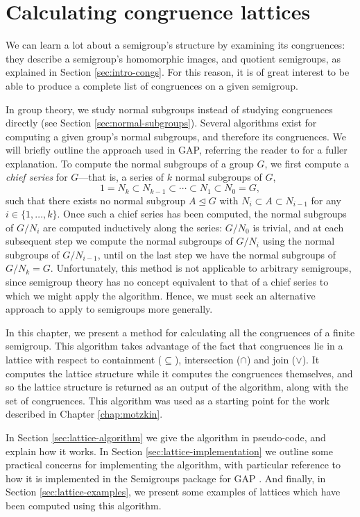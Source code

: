 \chapter{Calculating congruence lattices}
\label{chap:lattice}

We can learn a lot about a semigroup's structure by examining its congruences:
they describe a semigroup's homomorphic images, and quotient semigroups, as
explained in Section \ref{sec:intro-congs}.  For this reason, it is of great
interest to be able to produce a complete list of congruences on a given
semigroup.

In group theory, we study normal subgroups instead of studying congruences
directly (see Section \ref{sec:normal-subgroups}).  Several algorithms exist for
computing a given group's normal subgroups, and therefore its congruences.  We
will briefly outline the approach used in GAP, referring the reader to
\cite{hulpke_1998} for a fuller explanation.  To compute the normal subgroups of
a group $G$, we first compute a \textit{chief series} for $G$---that is, a
series of $k$ normal subgroups of $G$,
$$1 = N_k
\subset N_{k-1}
\subset \cdots
\subset N_1
\subset N_0 = G,$$
such that there exists no normal subgroup $A \trianglelefteq G$ with
$N_i \subset A \subset N_{i-1}$ for any $i \in \{1, \ldots, k\}$.
Once such a chief series has been computed, the normal subgroups of $G / N_i$
are computed inductively along the series: $G / N_0$ is trivial, and at each
subsequent step we compute the normal subgroups of $G / N_i$ using the normal
subgroups of $G / N_{i-1}$, until on the last step we have the normal subgroups
of $G / N_k = G$.  Unfortunately, this method is not applicable to arbitrary
semigroups, since semigroup theory has no concept equivalent to that of a chief
series to which we might apply the algorithm.  Hence, we must seek an
alternative approach to apply to semigroups more generally.

In this chapter, we present a method for calculating all the congruences of a
finite semigroup.  This algorithm takes advantage of the fact that congruences
lie in a lattice with respect to containment ($\subseteq$), intersection
($\cap$) and join ($\vee$).  It computes the lattice structure while it computes
the congruences themselves, and so the lattice structure is returned as an
output of the algorithm, along with the set of congruences.  This algorithm was
used as a starting point for the work described in Chapter \ref{chap:motzkin}.

In Section \ref{sec:lattice-algorithm} we give the algorithm in pseudo-code, and
explain how it works.  In Section \ref{sec:lattice-implementation} we outline
some practical concerns for implementing the algorithm, with particular
reference to how it is implemented in the Semigroups package \cite{semigroups}
for GAP \cite{gap}.  And finally, in Section \ref{sec:lattice-examples}, we
present some examples of lattices which have been computed using this algorithm.

